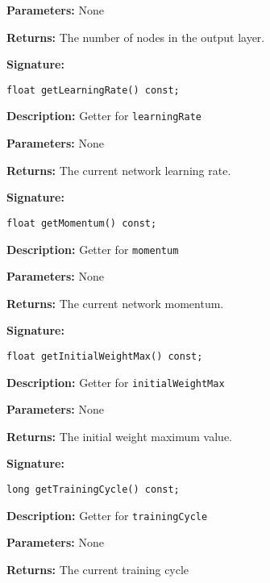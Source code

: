 \documentclass[a4paper]{article}
\begin{document}
\textbf{Parameters: } None

\textbf{Returns: }
The number of nodes in the output layer.

\hrulefill %

\textbf{Signature:} \begin{lstlisting}
float getLearningRate() const;
\end{lstlisting}

\textbf{Description: }
Getter for \lstinline{learningRate}

\textbf{Parameters: } None

\textbf{Returns: }
The current network learning rate.

\hrulefill %

\textbf{Signature:} \begin{lstlisting}
float getMomentum() const;
\end{lstlisting}

\textbf{Description: }
Getter for \lstinline{momentum}

\textbf{Parameters: } None

\textbf{Returns: }
The current network momentum.

\hrulefill %

\textbf{Signature:} \begin{lstlisting}
float getInitialWeightMax() const;
\end{lstlisting}

\textbf{Description: }
Getter for \lstinline{initialWeightMax}

\textbf{Parameters: } None

\textbf{Returns: }
The initial weight maximum value.

\hrulefill %

\textbf{Signature:} \begin{lstlisting}
long getTrainingCycle() const;
\end{lstlisting}

\textbf{Description: }
Getter for \lstinline{trainingCycle}

\textbf{Parameters: } None

\textbf{Returns: }
The current training cycle

\hrulefill %
\end{document}
